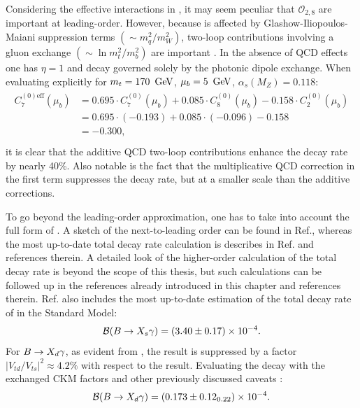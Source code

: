 Considering the effective interactions in , it may seem peculiar that $\mathcal{O}_{2,8}$ are important at leading-order.
However, because \BtoXsgamma is affected by Glashow-Iliopoulos-Maiani suppression terms $(\sim m_q^2/m_W^2)$, two-loop contributions involving a gluon exchange $(\sim\ln m_t^2/m_b^2)$ are important \cite{Bertolini:1986th}.
In the absence of QCD effects one has $\eta=1$ and \BtoXsgamma decay governed solely by the photonic dipole exchange.
When evaluating  explicitly for $m_t=170~\mathrm{\,Ge\kern -0.1em V}$, $\mu_b=5~\mathrm{\,Ge\kern -0.1em V}$, $\alpha_s(M_Z)=0.118$\cite{Buras:1998raa}:
\begin{align}
    \begin{split}
        C_7^{(0)\mathrm{eff}}(\mu_b) &= 0.695 \cdot C_7^{(0)}(\mu_b) + 0.085 \cdot C_8^{(0)}(\mu_b) - 0.158 \cdot C_2^{(0)}(\mu_b)  \\ 
                          &= 0.695 \cdot (-0.193) + 0.085 \cdot (-0.096) - 0.158\\
                          &= -0.300, \\
    \end{split}
\end{align}
it is clear that the additive QCD two-loop contributions enhance the decay rate by nearly 40\%.
Also notable is the fact that the multiplicative QCD correction in the first term suppresses the decay rate, but at a smaller scale than the additive corrections.

To go beyond the leading-order approximation, one has to take into account the full form of .
A sketch of the next-to-leading order can be found in Ref.\cite{Gambino:2001ew}, whereas the most up-to-date total decay rate calculation is describes in Ref.\cite{Misiak:2020vlo} and references therein.
A detailed look of the higher-order calculation of the total \BtoXsgamma decay rate is beyond the scope of this thesis, but such calculations can be followed up in the references already introduced in this chapter and references therein. 
Ref.\cite{Misiak:2020vlo} also includes the most up-to-date estimation of the total decay rate of \BtoXsgamma in the Standard Model:
\begin{equation}\label{eq:btosgamma_theoretical}
    \mathcal{B}(\BtoXsgamma) = (3.40\pm 0.17) \times 10^{-4}.
\end{equation}
For $\BtoXdgamma$, as evident from , the result is suppressed by a factor $|V_{td}/V_{ts}|^2\approx 4.2\%$ with respect to the \BtoXsgamma result.
Evaluating the decay with the exchanged CKM factors and other previously discussed caveats \cite{Misiak:2015xwa}:
\begin{equation}\label{eq:btodgamma_theoretical}
    \mathcal{B}(\BtoXdgamma) = (0.173\pm{0.12}_{0.22}) \times 10^{-4}.
\end{equation}

